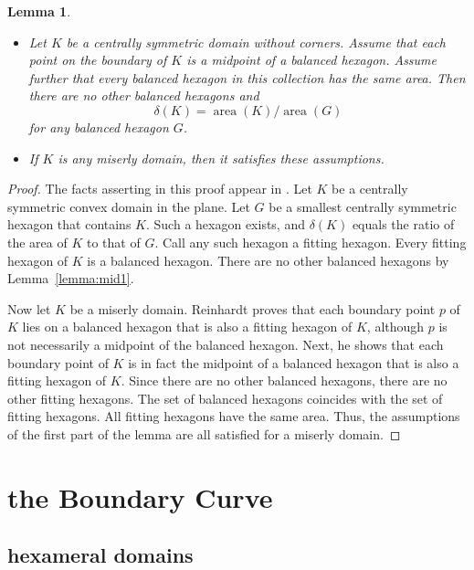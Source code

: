 \documentclass[11pt]{amsart}
\newtheorem{lemma}{Lemma}
\def\op#1{{\operatorname{#1}}}
\def\deltalat{\mathbb\delta}  %
\def\aa{{\op{area}}}
\begin{document}
\begin{lemma}\label{lemma:mid-min} \hbox{ }
\begin{itemize}
\item Let $K$ be a centrally symmetric domain without corners.  Assume that each point
on the boundary of $K$ is a midpoint of a balanced hexagon.  Assume further that
every balanced hexagon in this collection has the same area.  Then there are no other
balanced hexagons and
\begin{equation}\label{eqn:density}
\deltalat(K) = \aa(K)/\aa(G)
\end{equation}
for any balanced hexagon $G$.
\item If $K$ is any miserly domain, then it satisfies these assumptions.
\end{itemize}
\end{lemma}
%
\begin{proof} The facts asserting in this proof 
appear in \cite[pp.219--222]{R}.
Let $K$ be a centrally symmetric convex domain in the plane.
Let $G$ be a smallest centrally symmetric hexagon that contains
$K$.  Such a hexagon exists, and $\deltalat(K)$ equals
the ratio of the area of $K$ to that of $G$. %
Call any such hexagon a fitting hexagon.
Every fitting hexagon of $K$ is a balanced hexagon. %
There are no other balanced hexagons by Lemma~\ref{lemma:mid1}.

Now let $K$ be a miserly domain.
Reinhardt proves that each boundary point $p$ of $K$ lies on a  balanced hexagon that is also a fitting hexagon of $K$, 
although $p$ is not necessarily 
a midpoint of the balanced hexagon.  %
Next, he shows that each boundary point of $K$ is in fact the midpoint
of a balanced hexagon that is also a 
fitting hexagon of $K$. %
Since there are no other balanced hexagons, there are no other fitting hexagons.  The set of balanced
hexagons coincides with the set of fitting hexagons. 
All fitting hexagons have the same area.  Thus, the assumptions of the first part of the lemma
are all satisfied for a miserly domain.
\end{proof}






\section{the Boundary Curve}


\subsection{hexameral domains}
\end{document}
